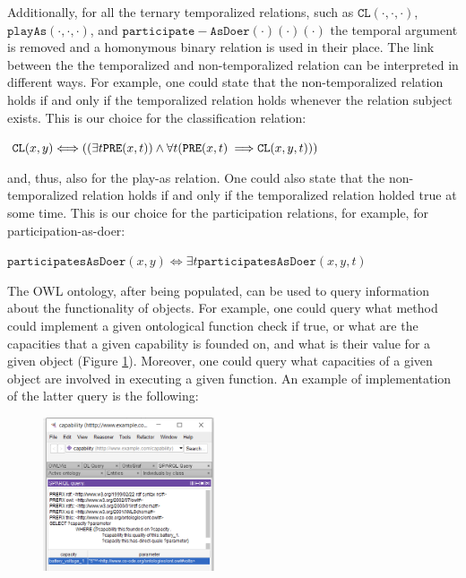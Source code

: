 \documentclass[sw]{iosart2x}
\newcommand{\bflist}{\begin{list}{}{\setlength{\topsep}{2mm}\setlength{\partopsep}{0mm}\setlength{\parsep}{0mm}\setlength{\leftmargin}{9mm}\setlength{\labelwidth}{8mm}}}
\newcommand{\eflist}{\end{list}}
\newcommand{\DefLabel}{\textrm{d}}
\newcounter{cntdef}
\newcommand{\mydf}[1]{\refstepcounter{cntdef}\begin{small}{\bf \DefLabel\thecntdef\label{def:#1}}\end{small}}
\newcommand{\generalStyle}[1]{\texttt{#1}}
\newcommand{\biRel}[3]{\generalStyle{#1}(#2,#3)}
\newcommand{\triRel}[4]{\generalStyle{#1}(#2,#3,#4)}
\newcommand{\myiff}{\Longleftrightarrow}
\newcommand{\myfi}{\hspace{0.9mm} \Longrightarrow}
\newcommand{\OWL}{\textnormal{OWL}\xspace}
\newcommand{\DOLCECLbyBinary}[2]{\biRel{CL}{#1}{#2}}
\newcommand{\DOLCECLby}[3]{\triRel{CL}{#1}{#2}{#3}}
\newcommand{\DOLCEPRE}[2]{\biRel{PRE}{#1}{#2}}
\newcommand{\participateAsDoer}[3]{\triRel{participatesAsDoer}{#1}{#2}{#3}}
\newcommand{\participateAsDoerBinary}[2]{\biRel{participatesAsDoer}{#1}{#2}}
\newcommand{\playAs}[3]{\triRel{playAs}{#1}{#2}{#3}}
\newcommand{\TODO}[1]{{\color{red} #1}}
\begin{document}

Additionally, for all the ternary temporalized relations, such as $\DOLCECLby{\cdot}{\cdot}{\cdot}$,  $\playAs{\cdot}{\cdot}{\cdot}$, and $\hspace{0pt}\texttt{participate}- \texttt{AsDoer}(\cdot)(\cdot)(\cdot)$ the temporal argument is removed and a homonymous binary relation is used in their place.
The link between the the temporalized and non-temporalized relation can be interpreted in different ways. For example, one could state that the non-temporalized relation holds if and only if the temporalized relation holds whenever the relation subject exists. This is our choice for the classification relation:
\bflist
\item[\mydf{CLnontemp}] $ \DOLCECLbyBinary{x}{y} \myiff ((\exists t \DOLCEPRE{x}{t}) \land \forall t (\DOLCEPRE{x}{t} \myfi  \DOLCECLby{x}{y}{t})) $
\eflist
and, thus, also for the play-as relation. 
One could also state that the non-temporalized relation holds if and only if the temporalized relation holded true at some time. This is our choice for the participation relations, for example, for participation-as-doer: 
\bflist
\item[\mydf{participationDoerNonTemp}] $ \participateAsDoerBinary{x}{y} \myiff \exists t \participateAsDoer{x}{y}{t}$
\eflist

The \OWL ontology, after being populated, can be used to query information about the functionality of objects. For example, one could query what method could implement a given ontological function \TODO{check if true}, or what are the capacities that a given capability is founded on, and what is their value for a given object (Figure \ref{fig:screen_query}). Moreover, one could query what capacities of a given object are involved in executing a given function. An example of implementation of the latter query is the following:



\begin{figure}
  \centering
  \includegraphics[width=0.45\textwidth]{query_screenshot.PNG}
  \caption{\label{fig:screen_query}}
\end{figure}
\end{document}
